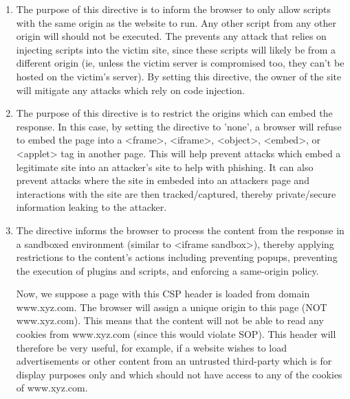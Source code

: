 \documentclass[12pt]{article}
\begin{document}
\begin{enumerate}[label=(\alph*)]
\item The purpose of this directive is to inform the browser to only allow scripts with the same origin as the website to run. Any other script from any other origin will should not be executed. The prevents any attack that relies on injecting scripts into the victim site, since these scripts will likely be from a different origin (ie, unless the victim server is compromised too, they can't be hosted on the victim's server). By setting this directive, the owner of the site will mitigate any attacks which rely on code injection.

\item The purpose of this directive is to restrict the origins which can embed the response. In this case, by setting the directive to 'none', a browser will refuse to embed the page into a <frame>, <iframe>, <object>, <embed>, or <applet> tag in another page. This will help prevent attacks which embed a legitimate site into an attacker's site to help with phishing. It can also prevent attacks where the site in embeded into an attackers page and interactions with the site are then tracked/captured, thereby private/secure information leaking to the attacker.

\item The directive informs the browser to process the content from the response in a sandboxed environment (similar to <iframe sandbox>), thereby applying restrictions to the content's actions including preventing popups, preventing the execution of plugins and scripts, and enforcing a same-origin policy.

Now, we suppose a page with this CSP header is loaded from domain www.xyz.com. The browser will assign a unique origin to this page (NOT www.xyz.com). This means that the content will not be able to read any cookies from www.xyz.com (since this would violate SOP). This header will therefore be very useful, for example, if a website wishes to load advertisements or other content from an untrusted third-party which is for display purposes only and which should not have access to any of the cookies of www.xyz.com.
\end{enumerate}

\pagebreak
\end{document}
